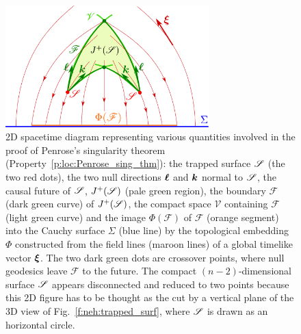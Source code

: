 \begin{figure}
\centerline{\includegraphics[width=0.7\textwidth]{loc_penrose_thm.pdf}}
\caption[]{\label{f:loc:penrose_thm} \footnotesize
2D spacetime diagram representing various quantities involved in the
proof of Penrose's singularity theorem (Property~\ref{p:loc:Penrose_sing_thm}):
the trapped surface $\mathscr{S}$ (the two red dots),
the two null directions $\bm{\ell}$ and $\bm{k}$ normal to $\mathscr{S}$,
the causal future of $\mathscr{S}$, $J^+(\mathscr{S})$ (pale green region),
the boundary $\mathscr{F}$ (dark green curve)
of $J^+(\mathscr{S})$, the compact space $\mathscr{V}$ containing $\mathscr{F}$ (light green curve)
and the image $\Phi(\mathscr{F})$ of $\mathscr{F}$ (orange segment) into
the Cauchy surface $\Sigma$ (blue line) by the topological embedding $\Phi$
constructed from the field lines (maroon lines) of a global timelike vector
$\bm{\xi}$. The two dark green dots are crossover points, where null
geodesics leave $\mathscr{F}$ to the future.
The compact $(n-2)$-dimensional surface $\mathscr{S}$ appears disconnected and reduced
to two points because this 2D figure has to be thought as the cut by a vertical plane
of the 3D view of Fig.~\ref{f:neh:trapped_surf}, where $\mathscr{S}$ is drawn as
an horizontal circle.
}
\end{figure}



